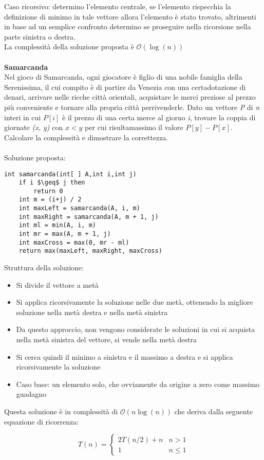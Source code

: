 \documentclass[../cheatSheetAlgoritmi.tex]{subfiles}
\begin{document}
Caso ricorsivo: determino l'elemento centrale, se l'elemento rispecchia la definizione di minimo in tale vettore allora l'elemento è stato trovato, altrimenti in base ad un semplice confronto determino se proseguire nella ricorsione nella parte sinistra o destra. \\
La complessità della soluzione proposta è $\mathcal{O}(\log(n))$
\\\\
\textbf{Samarcanda}\\
Nel gioco di Samarcanda, ogni giocatore è figlio di una nobile famiglia della Serenissima, il cui compito è di partire da Venezia con una certadotazione di denari, arrivare nelle ricche città orientali, acquistare le merci preziose al prezzo più conveniente e tornare alla propria città perrivenderle. Dato un vettore \textit{P} di \textit{n} interi in cui $P[i]$ è il prezzo di una certa merce al giorno \textit{i}, trovare la coppia di giornate \textit{(x, y)} con $x < y$ per cui risultamassimo il valore $P[y]-P[x]$. Calcolare la complessità e dimostrare la correttezza.\\\\
Soluzione proposta:
\begin{lstlisting}[caption=Samarcanda]
int samarcanda(int[ ] A,int i,int j)
	if i $\geq$ j then
    	return 0
  	int m = (i+j) / 2
  	int maxLeft = samarcanda(A, i, m)
  	int maxRight = samarcanda(A, m + 1, j)
  	int ml = min(A, i, m)
  	int mr = max(A, m + 1, j)
  	int maxCross = max(0, mr - ml)
  	return max(maxLeft, maxRight, maxCross)
\end{lstlisting}
Struttura della soluzione:
\begin{itemize}
	\item Si divide il vettore a metà
	\item Si applica ricorsivamente la soluzione nelle due metà, ottenendo la migliore soluzione nella metà destra e nella metà sinistra
	\item Da questo approccio, non vengono considerate le soluzioni in cui si acquista nella metà sinistra del vettore, si vende nella metà destra
	\item Si cerca quindi il minimo a sinistra e il massimo a destra e si applica ricorsivamente la soluzione
	\item Caso base: un elemento solo, che ovviamente da origine a zero come massimo guadagno
\end{itemize}
Questa soluzione è in complessità di $\mathcal{O}(n\log(n))$ che deriva dalla seguente equazione di ricorrenza:
\begin{center}
	\begin{equation*}
  		T(n)=\begin{cases}
    		2T(n/2) + n & \text{$n > 1$}\\
    		1 & \text{$n \leq 1$}
  		\end{cases}
	\end{equation*}
\end{center}
\end{document}
